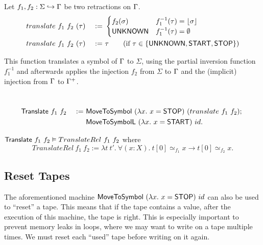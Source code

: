 \begin{definition}
  \label{def:translate}
  Let $f_1, f_2 : \Sigma \hookrightarrow \Gamma$ be two retractions on $\Gamma$.
  \begin{alignat*}{2}
    & translate~f_1~f_2~(\tau) &~:=~&
    \begin{cases}
      f_2(\sigma)  & f_1^{-1}(\tau) = \left\lfloor {\sigma} \right\rfloor \\
      \textsf{UNKNOWN} & f_1^{-1}(\tau) = \emptyset
    \end{cases} \\
    & translate~f_1~f_2~(\tau) &~:=~& \tau \qquad\text{(if $\tau \in \{\textsf{UNKNOWN}, \textsf{START}, \textsf{STOP}\}$)} 
  \end{alignat*}
\end{definition}

This function translates a symbol of $\Gamma$ to $\Sigma$, using the partial inversion function $f_1^{-1}$ and afterwards applies the injection $f_2$
from $\Sigma$ to $\Gamma$ and the (implicit) injection from $\Gamma$ to $\Gamma^+$.

\begin{definition}[$\MS{Translate}$]
  ~
  \begin{alignat*}{2}
    & \textsf{Translate}~f_1~f_2 &~:=~& \textsf{MoveToSymbol}~(\lambda x.~x=\textsf{STOP})~(translate~f_1~f_2) ;~ \\
    &                        &~  ~& \textsf{MoveToSymbolL}~(\lambda x.~x=\textsf{START})~id.
  \end{alignat*}
\end{definition}

\begin{lemma}
  $\textsf{Translate}~f_1~f_2 \vDash TranslateRel~f_1~f_2$ where
  \[
    TranslateRel~f_1~f_2 := \lambda t~t'.~\forall(x:X).~t[0] \simeq_{f_1} x \rightarrow t[0] \simeq_{f_2} x.
  \]
\end{lemma}


\subsection{Reset Tapes}
\label{sec:reset-tape}

The aforementioned machine $\textsf{MoveToSymbol}~(\lambda x.~x=\textsf{STOP})~id$ can also be used to ``reset'' a tape.  This means that if the tape contains
a value, after the execution of this machine, the tape is right.  This is especially important to prevent memory leaks in loops, where we may want to
write on a tape multiple times.  We must reset each ``used'' tape before writing on it again.

